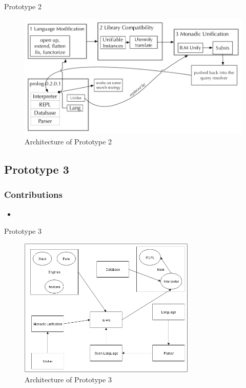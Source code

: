 \documentclass[hideothersubsections, t, aspectratio=1610]{beamer}
\begin{document}
\begin{frame}{Prototype 2}
\begin{figure}[H]
  \includegraphics[width=1\textwidth]{Prototype-2-architecture.jpeg}
  \caption{Architecture of Prototype 2}
  \label{fig:proto1-arch}
\end{figure}

\end{frame}


\subsection{Prototype 3}

\begin{frame}
\frametitle{Contributions}
\begin{itemize}
\item
\end{itemize}
\end{frame}

\begin{frame}{Prototype 3}
\begin{figure}[H]
  \includegraphics[width=0.75\textwidth]{Prototype-3-architecture.jpeg}
  \caption{Architecture of Prototype 3}
  \label{fig:proto1-arch}
\end{figure}
\end{frame}
\end{document}
